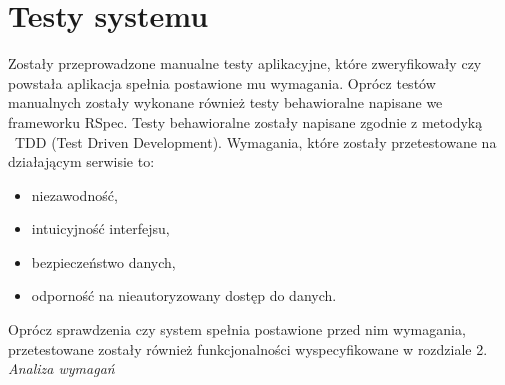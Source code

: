 \chapter{Testy systemu}
\label{cha;testySystemu}

Zostały przeprowadzone manualne testy aplikacyjne, które zweryfikowały czy powstała aplikacja spełnia postawione mu wymagania. Oprócz testów manualnych zostały wykonane również testy behawioralne napisane we frameworku RSpec. Testy behawioralne zostały napisane zgodnie z metodyką  TDD (Test Driven Development). Wymagania, które zostały przetestowane na działającym serwisie to:
\begin{itemize}
\item niezawodność,
\item intuicyjność interfejsu,
\item bezpieczeństwo danych,
\item odporność na nieautoryzowany dostęp do danych.
\end{itemize}
Oprócz sprawdzenia czy system spełnia postawione przed nim wymagania, przetestowane zostały również funkcjonalności wyspecyfikowane w rozdziale 2. \textit{Analiza wymagań}

